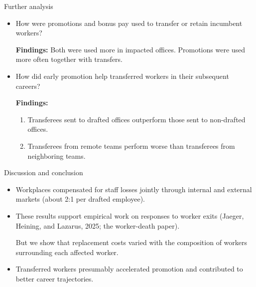 \begin{frame}{Further analysis}
    \begin{itemize}
        \item How were promotions and bonus pay used to transfer or retain incumbent workers?

        \textbf{Findings:} Both were used more in impacted offices. Promotions were used more often together with transfers.

        \vspace{0.5em}

        \item How did early promotion help transferred workers in their subsequent careers?

        \textbf{Findings:}
        \begin{enumerate}
            \item Transferees sent to drafted offices outperform those sent to non-drafted offices.

            \item Transferees from remote teams perform worse than transferees from neighboring teams.
        \end{enumerate}
    \end{itemize}
\end{frame}

\begin{frame}{Discussion and conclusion}
    \begin{itemize}[<+->]
        \item Workplaces compensated for staff losses jointly through internal and external markets (about 2:1 per drafted employee).

        \item These results support empirical work on responses to worker exits (Jaeger, Heining, and Lazarus, 2025; the worker-death paper).

        But we show that replacement costs varied with the composition of workers surrounding each affected worker.

        \item Transferred workers presumably accelerated promotion and contributed to better career trajectories.
    \end{itemize}
\end{frame}